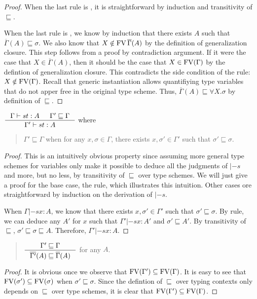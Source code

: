 \begin{proof}
When the last rule is , it is straightforward by induction
and transitivity of $\sqsubseteq$.

When the last rule is , we know by induction that there exists
$A$ such that $\overline{\Gamma}(A) \sqsubseteq \sigma$. We also know
that $X \notin\mathop{\mathrm{FV}} \overline{\Gamma}(A)$ by the definition of generalization closure.
This step follows from a proof by contradiction argument.
If it were the case that $X\in\overline{\Gamma}(A)$, then it should be the case that
$X\in\mathop{\mathrm{FV}}(\Gamma)$
by the defintion of generalization closure. This contradicts the side condition of
the  rule: $X\notin\mathop{\mathrm{FV}}(\Gamma)$.
Recall that generic instantiation allows quantifiying type variables
that do not apper free in the original type scheme. Thus,
$\overline{\Gamma}(A) \sqsubseteq \forall X.\sigma$ by definition
of $\sqsubseteq$.
\end{proof}

\begin{lemma}
$ \inference{\Gamma |-s t : A & \Gamma' \sqsubseteq \Gamma}
	    {\Gamma' |-s t : A} $ where
\begin{quote}
$\Gamma' \sqsubseteq \Gamma$ when for any $x,\sigma\in \Gamma$,
there exists $x,\sigma'\in\Gamma'$ such that $\sigma'\sqsubseteq\sigma$.
\end{quote}
\label{lem:generalizeGamma}
\end{lemma}
\begin{proof}
This is an intuitively obvious property since assuming
more general type schemes for variables only make
it possible to deduce all the judgments of $|-s$ and more, but no less,
by transitivity of $\sqsubseteq$ over type schemes.
We will just give a proof for the base case, the  rule,
which illustrates this intuition.
Other cases ore straightforward by induction on the derivation of $|-s$.

When $\Gamma |-s x : A$, we know that there exists
$x,\sigma'\in\Gamma'$ such that $\sigma'\sqsubseteq\sigma$.
By  rule, we can deduce any $A'$ for $x$
such that $\Gamma' |-s x : A'$ and $\sigma'\sqsubseteq A'$.
By transitivity of $\sqsubseteq$, $\sigma' \sqsubseteq \sigma \sqsubseteq A$.
Therefore, $\Gamma' |-s x : A$.
\end{proof}

\begin{lemma}
\begin{quote}
$ \inference{\Gamma' \sqsubseteq \Gamma}
	    {\overline{\Gamma'}(A) \sqsubseteq \overline{\Gamma}(A)} $
for any $A$.
\end{quote}
\label{lem:closureMoreGen}
\end{lemma}
\begin{proof}
It is obvious once we observe that $\mathop{\mathrm{FV}}(\Gamma') \subseteq \mathop{\mathrm{FV}}(\Gamma)$.
It is easy to see that $\mathop{\mathrm{FV}}(\sigma') \subseteq \mathop{\mathrm{FV}}(\sigma)$
when $\sigma' \sqsubseteq \sigma$. Since the defintion of $\sqsubseteq$
over typing contexts only depends on $\sqsubseteq$ over type schemes,
it is clear that $\mathop{\mathrm{FV}}(\Gamma') \subseteq \mathop{\mathrm{FV}}(\Gamma)$.
\end{proof}

